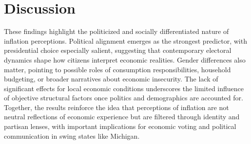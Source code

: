 \documentclass[preprint,12pt,authoryear]{elsarticle}
\begin{document}
\section{Discussion}
These findings highlight the politicized and socially differentiated nature of inflation perceptions. Political alignment emerges as the strongest predictor, with presidential choice especially salient, suggesting that contemporary electoral dynamics shape how citizens interpret economic realities. Gender differences also matter, pointing to possible roles of consumption responsibilities, household budgeting, or broader narratives about economic insecurity. The lack of significant effects for local economic conditions underscores the limited influence of objective structural factors once politics and demographics are accounted for. Together, the results reinforce the idea that perceptions of inflation are not neutral reflections of economic experience but are filtered through identity and partisan lenses, with important implications for economic voting and political communication in swing states like Michigan.


% 

% 


\newpage



\end{document}
